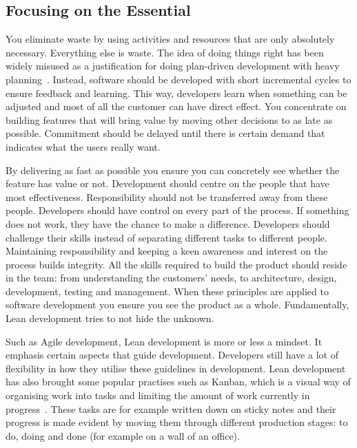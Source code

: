 \documentclass[english]{tktltiki2}
\begin{document}
\subsection{Focusing on the Essential}

You eliminate waste by using activities and resources that are only absolutely necessary. Everything else is waste. The idea of doing things right has been widely misused as a justification for doing plan-driven development with heavy planning~\cite{Pop02}. Instead, software should be developed with short incremental cycles to ensure feedback and learning. This way, developers learn when something can be adjusted and most of all the customer can have direct effect. You concentrate on building features that will bring value by moving other decisions to as late as possible. Commitment should be delayed until there is certain demand that indicates what the users really want.

By delivering as fast as possible you ensure you can concretely see whether the feature has value or not. Development should centre on the people that have most effectiveness. Responsibility should not be transferred away from these people. Developers should have control on every part of the process. If something does not work, they have the chance to make a difference. Developers should challenge their skills instead of separating different tasks to different people. Maintaining responsibility and keeping a keen awareness and interest on the process builds integrity. All the skills required to build the product should reside in the team: from understanding the customers’ needs, to architecture, design, development, testing and management. When these principles are applied to software development you ensure you see the product as a whole. Fundamentally, Lean development tries to not hide the unknown.

Such as Agile development, Lean development is more or less a mindset. It emphasis certain aspects that guide development. Developers still have a lot of flexibility in how they utilise these guidelines in development. Lean development has also brought some popular practises such as Kanban, which is a visual way of organising work into tasks and limiting the amount of work currently in progress~\cite{Mon12}. These tasks are for example written down on sticky notes and their progress is made evident by moving them through different production stages: to do, doing and done (for example on a wall of an office).

\end{document}
